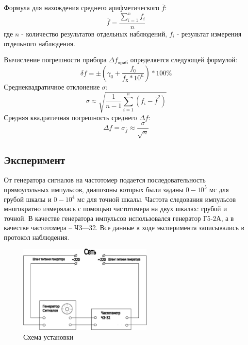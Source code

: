Формула для нахождения среднего арифметического $\overline{f}$:
\begin{equation}
  \overline{f} = \frac{\sum_{i=1}^{n} f_i}{n}
\end{equation}
где $n$ - количество результатов отдельных наблюдений, $f_i$ - результат измерения отдельного наблюдения.

Вычисление погрешности прибора $\Delta f_{\text{приб}}$ определяется следующей формулой:
\begin{equation}
  \delta f = \pm ( \gamma_0 +  \frac{f_{\text{0}}}{f_{\text{х}}*10^n})* 100\%
\end{equation}
Среднеквадратичное отклонение $\sigma$:
\begin{equation}
  \sigma \approx \sqrt{\frac{1}{n-1} \sum_{i = 1}^{n} (f_i -\overline{f}^2)}
\end{equation}
Средняя квадратичная погрешность среднего $\Delta f$:
\begin{equation}
  \Delta f = \sigma_{\overline{f}} \approx \frac{\sigma}{\sqrt{n}}
\end{equation}

\subsection{Эксперимент}
От генератора сигналов на частотомер подается последовательность
прямоугольных импульсов, диапозоны которых были заданы $0-10^5$ мс для грубой шкалы и $0-10^4$ мс для точной шкалы.
Частота следования импульсов многократно измерялась с помощью частотомера на двух
шкалах: грубой и точной. В качестве генератора импульсов использовался
генератор Г5-2А, а в качестве частотомера – Ч3—32. Все данные в ходе эксперимента записывались в протокол наблюдения. \\

\begin{figure}[H]
\centering
\includegraphics[width=0.6\textwidth]{sketch1.eps}
\caption{Схема установки}
\label{fig:sketch}
\end{figure}

